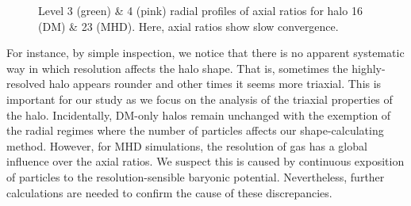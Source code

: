 \begin{figure}[!ht]
  \centering
  \hfill%
  \caption{Level 3 (green) \& 4 (pink) radial profiles of axial ratios for halo 16 (DM) \& 23 (MHD). Here, axial ratios show slow convergence. }
  \label{fig:badConvergence}
\end{figure}


For instance, by simple inspection, we notice that there is no apparent systematic way in which resolution affects the halo shape. That is, sometimes the highly-resolved halo appears rounder and other times it seems more triaxial. This is important for our study as we focus on the analysis of the triaxial properties of the halo. Incidentally, DM-only halos remain unchanged with the exemption of the radial regimes where the number of particles affects our shape-calculating method. However, for MHD simulations, the resolution of gas has a global influence over the axial ratios. We suspect this is caused by continuous exposition of particles to the resolution-sensible baryonic potential. Nevertheless, further calculations are needed to confirm the cause of these discrepancies.\\

